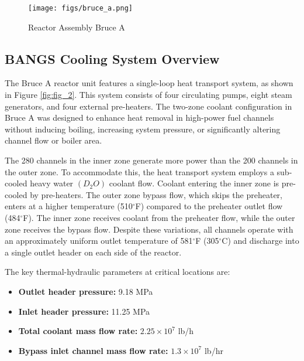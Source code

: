 \documentclass[12pt]{article}
\begin{document}
\begin{figure}
    \centering
    \texttt{[image: figs/bruce\_a.png]}
    \caption{Reactor Assembly Bruce A}
    \label{fig:fig_1}
\end{figure}


\begin{multicols}{2}
\section{BANGS Cooling System Overview}

The Bruce A reactor unit features a single-loop heat transport system, as shown in Figure \ref{fig:fig_2}. This system consists of four circulating pumps, eight steam generators, and four external pre-heaters. The two-zone coolant configuration in Bruce A was designed to enhance heat removal in high-power fuel channels without inducing boiling, increasing system pressure, or significantly altering channel flow or boiler area.

The 280 channels in the inner zone generate more power than the 200 channels in the outer zone. To accommodate this, the heat transport system employs a sub-cooled heavy water $(D_{2}O)$ coolant flow. Coolant entering the inner zone is pre-cooled by pre-heaters. The outer zone bypass flow, which skips the preheater, enters at a higher temperature (510$^{\circ}$F) compared to the preheater outlet flow (484$^{\circ}$F). The inner zone receives coolant from the preheater flow, while the outer zone receives the bypass flow. Despite these variations, all channels operate with an approximately uniform outlet temperature of 581$^{\circ}$F (305$^{\circ}$C) and discharge into a single outlet header on each side of the reactor.

The key thermal-hydraulic parameters at critical locations are:

\begin{itemize}
    \item \textbf{Outlet header pressure:} 9.18 MPa
    \item \textbf{Inlet header pressure:} 11.25 MPa
    \item \textbf{Total coolant mass flow rate:} $2.25 \times 10^7$ lb/h
    \item \textbf{Bypass inlet channel mass flow rate:} $1.3 \times 10^7$ lb/hr
\end{itemize}


\end{multicols}
\end{document}
